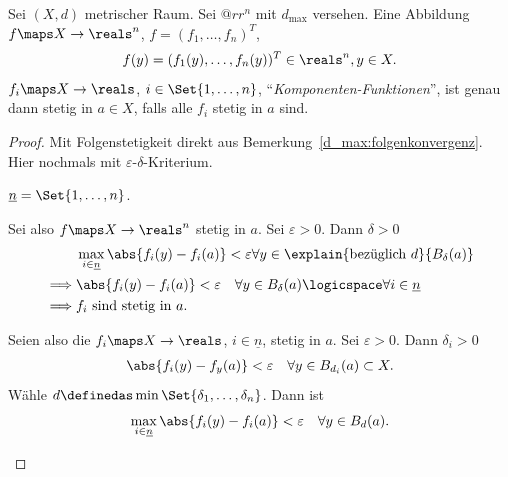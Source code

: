 \begin{lemma}\label{d_max:metrischer_raum_zu_r_stetigkeit:komponenten}
    Sei \( (X,d)\) metrischer Raum. Sei \( @rr
    ^n\) mit \( d_{\max}\) versehen. Eine Abbildung \( f\maps X\to \reals ^n\), \( f=(f_1,\ldots, f_n)^T\), 
    \begin{align*}
        f(y)=(f_1(y),\ldots, f_n(y))^T\in \reals^n, y\in X.
    \end{align*}   
    \( f_i\maps X\to \reals \), \( i\in \Set{1,\ldots,n}\), \enquote{\emph{Komponenten-Funktionen}}, ist genau dann stetig in \( a\in X\), falls alle \( f_i\) stetig in \( a\) sind.
\end{lemma}
\begin{proof}
    Mit Folgenstetigkeit direkt aus Bemerkung~\ref{d_max:folgenkonvergenz}. Hier nochmals mit \( \varepsilon\)-\( \delta\)-Kriterium.
    \begin{notation*}
        \( \underline{n}=\Set{1,\ldots,n}\). 
    \end{notation*}
    \begin{proofdescription}
        \item[\hin] Sei also \( f\maps X\to \reals^n\) stetig in \( a\). Sei \( \varepsilon>0\). Dann \texists \( \delta>0\) \sd
        \begin{align*}
            &\max_{i\in \underline{n}}\abs{f_i(y)-f_i(a)}<\varepsilon\forall y\in \explain{\text{bezüglich }d}{B_\delta(a)}\\
            \implies &\abs{f_i(y)-f_i(a)}<\varepsilon\quad \forall y\in B_\delta(a)\logicspace \forall i\in \underline{n}\\
            \implies &f_i\text{ sind stetig in }a.
        \end{align*}  
        \item[\rueck] Seien also die \( f_i\maps X\to \reals \), \( i\in \underline{n}\), stetig in \( a\). Sei \( \varepsilon>0\). Dann \texists \( \delta_i>0\) \sd 
        \begin{align*}
            \abs{f_i(y)-f_y(a)}<\varepsilon\quad \forall y\in B_{d_i}(a)\subset X. 
        \end{align*}   
        Wähle \( d\definedas \min \Set{\delta_1,\ldots,\delta_n}\). Dann ist
        \begin{align*}
            \max_{i\in \underline{n}}\abs{f_i(y)-f_i(a)}<\varepsilon\quad \forall y\in B_d(a). 
        \end{align*} 
    \end{proofdescription}
\end{proof}
